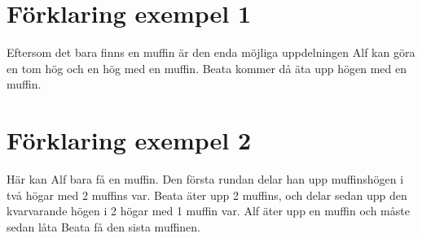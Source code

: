 \section*{Förklaring exempel 1}
Eftersom det bara finns en muffin är den enda möjliga uppdelningen Alf kan göra en tom hög och en hög med en muffin. Beata kommer då äta upp högen med en muffin. 

\section*{Förklaring exempel 2}
Här kan Alf bara få en muffin. Den första rundan delar han upp muffinshögen i två högar med 2 muffins var. Beata äter upp 2 muffins, och delar sedan upp den kvarvarande högen i 2 högar med 1 muffin var. Alf äter upp en muffin och måste sedan låta Beata få den sista muffinen.
